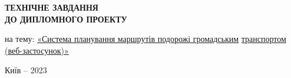 \clearpage
\begin{center}
\vspace*{\fill}

{\fontsize{18}{22}\selectfont
\textbf{\uppercase{Технічне завдання \\ до дипломного проекту}}
}

на тему: \underline{«Система планування маршрутів подорожі громадським} \newline 
\underline{транспортом (веб-застосунок)»}
\vfill %

Київ -- 2023
\end{center}

\thispagestyle{empty}

\clearpage